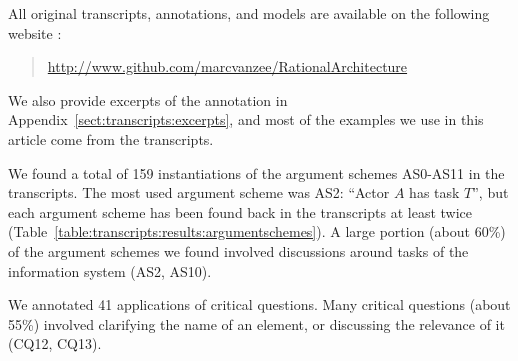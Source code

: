 All original transcripts, annotations, and models are available on the following website :
\begin{quote} \url{http://www.github.com/marcvanzee/RationalArchitecture}
\end{quote}
We also provide excerpts of the annotation in Appendix~\ref{sect:transcripts:excerpts}, and most of the examples we use in this article come from the transcripts.

We found a total of 159 instantiations of the argument schemes AS0-AS11 in the transcripts. The most used argument scheme was AS2: ``Actor $A$ has task $T$'', but each argument scheme has been found back in the transcripts at least twice (Table~\ref{table:transcripts:results:argumentschemes}). A large portion (about 60\%) of the argument schemes we found involved discussions around tasks of the information system (AS2, AS10).

We annotated 41 applications of critical questions. Many critical questions (about 55\%) involved clarifying the name of an element, or discussing the relevance of it (CQ12, CQ13).

